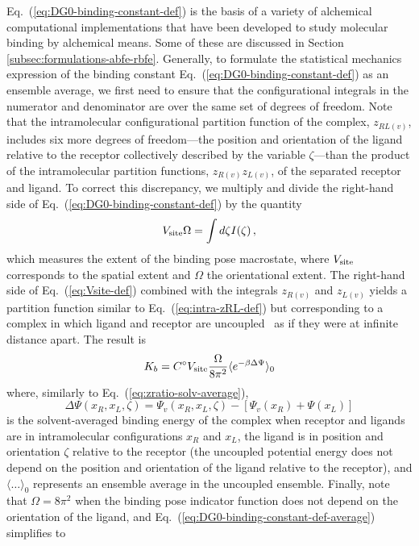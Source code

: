 \documentclass[9pt,bestpractices]{livecoms}
\begin{document}
Eq.~(\ref{eq:DG0-binding-constant-def}) is the basis of a variety of alchemical computational implementations that have been developed to study molecular binding by alchemical means. Some of these are discussed in Section \ref{subsec:formulations-abfe-rbfe}. Generally, to formulate the statistical mechanics expression of the binding constant Eq.~(\ref{eq:DG0-binding-constant-def}) as an ensemble average, we first need to ensure that the configurational integrals in the numerator and denominator are over the same set of degrees of freedom. Note that the intramolecular configurational partition function of the complex, $z_{RL(v)}$, includes six more degrees of freedom---the position and orientation of the ligand relative to the receptor collectively described by the variable $\zeta$---than the product of the intramolecular partition functions, $z_{R(v)} z_{L(v)}$, of the separated receptor and ligand. To correct this discrepancy, we multiply and divide the right-hand side of Eq.~(\ref{eq:DG0-binding-constant-def})  by the quantity
\begin{equation} \label{eq:Vsite-def}
    V_{\rm site} \Omega = \int d\zeta I(\zeta) \, ,
\end{equation}
which measures the extent of the binding pose macrostate, where $V_{\rm site}$ corresponds to the spatial extent and $\Omega$ the orientational extent. The right-hand side of Eq.~(\ref{eq:Vsite-def}) combined with the integrals $z_{R(v)}$ and $z_{L(v)}$ yields a partition function similar to Eq.~(\ref{eq:intra-zRL-def}) but corresponding to a complex in which ligand and receptor are uncoupled~\cite{gallicchio2011recent} as if they were at infinite distance apart. The result is
\begin{equation}\label{eq:DG0-binding-constant-def-average}
  K_b = C^\circ V_{\rm site} \frac{\Omega}{8 \pi^2} \langle e^{-\beta \Delta \Psi}  \rangle_0
\end{equation}
where, similarly to Eq.~(\ref{eq:zratio-solv-average}),
\begin{equation}\label{eq:pert-energy-def}
  \Delta \Psi(x_R, x_L, \zeta) =  \Psi_v(x_R, x_L, \zeta) - \left[  \Psi_v(x_R) + \Psi(x_L) \right]
\end{equation}
is the solvent-averaged binding energy of the complex when receptor and ligands are in intramolecular configurations $x_R$ and $x_L$, the ligand is in position and orientation $\zeta$ relative to the receptor (the uncoupled potential energy does not depend on  the position and orientation of the ligand relative to the receptor), and $\langle \ldots \rangle_0$ represents an ensemble average in the uncoupled ensemble. Finally, note that $\Omega = 8 \pi^2$ when the binding pose indicator function does not depend on the orientation of the ligand, and Eq.~(\ref{eq:DG0-binding-constant-def-average}) simplifies to
\end{document}
